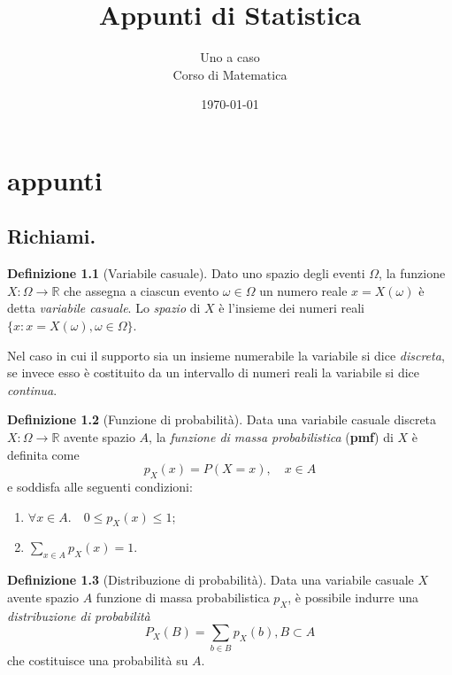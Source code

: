 \documentclass[fontsize=11pt,paper=A4,oneside,index=totoc,hyperref]{book}
\theoremstyle{definition}
\newtheorem{dfn}{Definizione}[]
\theoremstyle{plain}
\begin{document}
\title{Appunti di Statistica}

\author{
    Uno a caso \\[1cm]%
    Corso di Matematica %
}
\date{\today} %

\maketitle %

\tableofcontents %

\chapter{appunti}

\section{Richiami.}

\begin{dfn}[Variabile casuale]
  Dato uno spazio degli eventi \(\Omega\), la funzione \(X \colon \Omega \to \mathbb{R}\) che assegna a ciascun evento \(\omega \in \Omega\) un numero reale \(x = X(\omega)\) è detta \emph{variabile casuale}. Lo \emph{spazio} di \(X\) è l'insieme dei numeri reali \(\lbrace x \colon x = X(\omega), \omega \in \Omega\rbrace\).
\end{dfn}

Nel caso in cui il supporto sia un insieme numerabile la variabile si dice \emph{discreta}, se invece esso è costituito da un intervallo di numeri reali la variabile si dice \emph{continua}.

\begin{dfn}[Funzione di probabilità]
  Data una variabile casuale discreta \(X \colon \Omega \to \mathbb{R}\) avente spazio \(A\), la \emph{funzione di massa probabilistica} ({\bf pmf}) di \(X\) è definita come
  \[
  p_X(x) = P(X = x),\quad x \in A
  \]
  e soddisfa alle seguenti condizioni:
  \begin{enumerate}
    \item \(\forall x \in A.\quad 0 \le p_X(x) \le 1\);
    \item \(\sum_{x\in A}p_X(x) = 1\).
  \end{enumerate}
\end{dfn}

\begin{dfn}[Distribuzione di probabilità]
  Data una variabile casuale \(X\) avente spazio \(A\) funzione di massa probabilistica \(p_X\), è possibile indurre una \emph{distribuzione di probabilità}
  \begin{equation}
    P_X(B) = \sum_{b\in B}p_X(b), B \subset A
  \end{equation}
  che costituisce una probabilità su \(A\).
\end{dfn}
\end{document}
